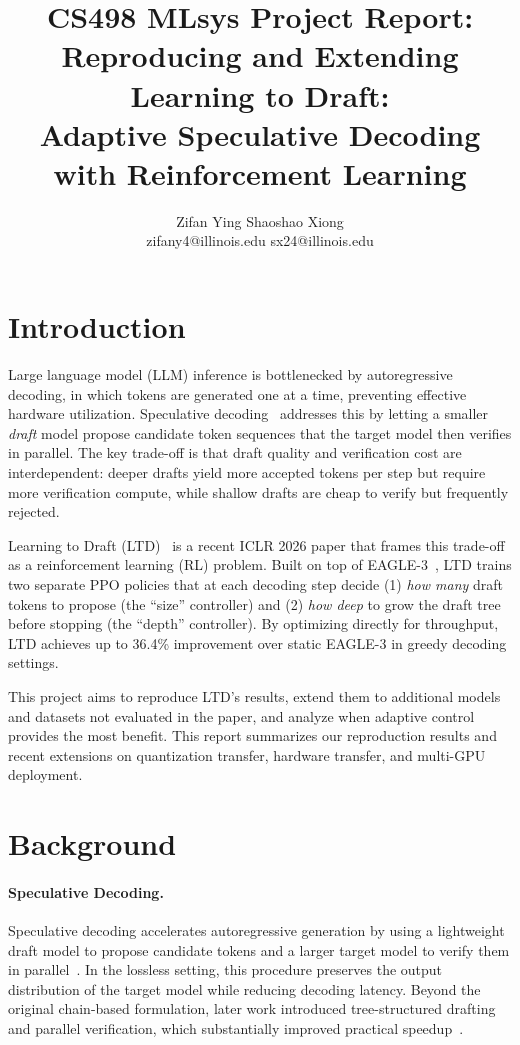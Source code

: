 \documentclass[letterpaper,twocolumn,10pt]{article}
\title{CS498 MLsys Project Report:\\Reproducing and Extending Learning to Draft:\\Adaptive Speculative Decoding with Reinforcement Learning}
\author{
\hspace{1.0cm} Zifan Ying \hspace{2.5cm} Shaoshao Xiong \\
\hspace{0.4cm} zifany4@illinois.edu \hspace{0.8cm} sx24@illinois.edu
}
\begin{document}
\maketitle

\section{Introduction}

Large language model (LLM) inference is bottlenecked by autoregressive decoding, in which tokens are generated one at a time, preventing effective hardware utilization. Speculative decoding~\cite{leviathan2023fast} addresses this by letting a smaller \emph{draft} model propose candidate token sequences that the target model then verifies in parallel. The key trade-off is that draft quality and verification cost are interdependent: deeper drafts yield more accepted tokens per step but require more verification compute, while shallow drafts are cheap to verify but frequently rejected.

Learning to Draft (LTD)~\cite{ltd2025} is a recent ICLR 2026 paper that frames this trade-off as a reinforcement learning (RL) problem. Built on top of EAGLE-3~\cite{eagle3}, LTD trains two separate PPO policies that at each decoding step decide (1) \emph{how many} draft tokens to propose (the ``size'' controller) and (2) \emph{how deep} to grow the draft tree before stopping (the ``depth'' controller). By optimizing directly for throughput, LTD achieves up to 36.4\% improvement over static EAGLE-3 in greedy decoding settings.

This project aims to reproduce LTD's results, extend them to additional models and datasets not evaluated in the paper, and analyze when adaptive control provides the most benefit. This report summarizes our reproduction results and recent extensions on quantization transfer, hardware transfer, and multi-GPU deployment.

\section{Background}

\paragraph{Speculative Decoding.}
Speculative decoding accelerates autoregressive generation by using a lightweight draft model to propose candidate tokens and a larger target model to verify them in parallel~\cite{leviathan2023fast,chen2023accelerating}. In the lossless setting, this procedure preserves the output distribution of the target model while reducing decoding latency. Beyond the original chain-based formulation, later work introduced tree-structured drafting and parallel verification, which substantially improved practical speedup~\cite{specinfer,eagle2,medusa}.
\end{document}
